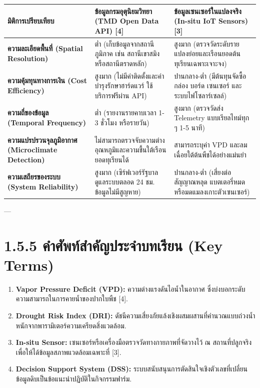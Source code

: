\documentclass[11pt,a4paper,openany]{report}
\begin{document}
\begin{table}[htbp]
\centering
\begin{tabularx}{\textwidth}{L L L}
\toprule
มิติการเปรียบเทียบ & ข้อมูลกรมอุตุนิยมวิทยา (TMD Open Data API) [4] & ข้อมูลเซนเซอร์ในแปลงจริง (In-situ IoT Sensors) [3] \\
\midrule
\textbf{ความละเอียดพื้นที่ (Spatial Resolution)} & ต่ำ (เก็บข้อมูลจากสถานีภูมิภาค เช่น สถานีเขาสมิง หรือสถานีตราดหลัก) & สูงมาก (ตรวจวัดระดับรายแปลงย่อยและเรือนยอดต้นทุเรียนเฉพาะเจาะจง) \\
\textbf{ความคุ้มทุนทางการเงิน (Cost Efficiency)} & สูงมาก (ไม่มีค่าติดตั้งและค่าบำรุงรักษาฮาร์ดแวร์ ใช้บริการฟรีผ่าน API) & ปานกลาง-ต่ำ (มีต้นทุนจัดซื้อกล่อง บอร์ด เซนเซอร์ และระบบไฟโซลาร์เซลล์) \\
\textbf{ความถี่ของข้อมูล (Temporal Frequency)} & ต่ำ (รายงานรายคาบเวลา 1-3 ชั่วโมง หรือรายวัน) & สูงมาก (ตรวจวัดส่ง Telemetry แบบเรียลไทม์ทุก ๆ 1-5 นาที) \\
\textbf{ความแปรปรวนจุลภูมิอากาศ (Microclimate Detection)} & ไม่สามารถตรวจจับความต่างอุณหภูมิและความชื้นใต้เรือนยอดทุเรียนได้ & สามารถระบุค่า VPD และลมเฉื่อยใต้ต้นพืชได้อย่างแม่นยำ \\
\textbf{ความเสถียรของระบบ (System Reliability)} & สูงมาก (เซิร์ฟเวอร์รัฐบาลดูแลระบบตลอด 24 ชม. ข้อมูลไม่มีสูญหาย) & ปานกลาง-ต่ำ (เสี่ยงต่อสัญญาณหลุด แบตเตอรี่หมด หรือมดแมลงเกาะตัวเซนเซอร์) \\
\bottomrule
\end{tabularx}
\end{table}


---

\section{1.5.5 คำศัพท์สำคัญประจำบทเรียน (Key Terms)}


\begin{enumerate}
  \item \textbf{Vapor Pressure Deficit (VPD):} ความต่างแรงดันไอน้ำในอากาศ ซึ่งบ่งบอกระดับความสามารถในการคายน้ำของปากใบพืช [4].
  \item \textbf{Drought Risk Index (DRI):} ดัชนีความเสี่ยงภัยแล้งเชิงผสมผสานที่คำนวณแบบถ่วงน้ำหนักจากพารามิเตอร์ความเครียดสิ่งแวดล้อม.
  \item \textbf{In-situ Sensor:} เซนเซอร์หรือเครื่องมือตรวจวัดทางกายภาพที่จัดวางไว้ ณ สถานที่ปลูกจริง เพื่อให้ได้ข้อมูลสภาพแวดล้อมเฉพาะที่ [3].
  \item \textbf{Decision Support System (DSS):} ระบบสนับสนุนการตัดสินใจเชิงตัวเลขที่เปลี่ยนข้อมูลดิบเป็นข้อแนะนำปฏิบัติในกิจกรรมฟาร์ม.
\end{enumerate}
\end{document}
